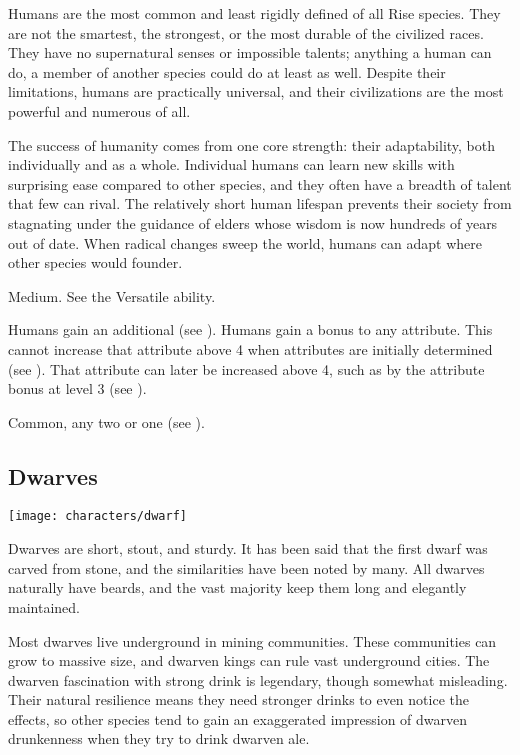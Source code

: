         Humans are the most common and least rigidly defined of all Rise species.
        They are not the smartest, the strongest, or the most durable of the civilized races.
        They have no supernatural senses or impossible talents; anything a human can do, a member of another species could do at least as well.
        Despite their limitations, humans are practically universal, and their civilizations are the most powerful and numerous of all.

        The success of humanity comes from one core strength: their adaptability, both individually and as a whole.
        Individual humans can learn new skills with surprising ease compared to other species, and they often have a breadth of talent that few can rival.
        The relatively short human lifespan prevents their society from stagnating under the guidance of elders whose wisdom is now hundreds of years out of date.
        When radical changes sweep the world, humans can adapt where other species would founder.

         Medium.
         See the Versatile ability.
        \begin{raggeditemize}
             Humans gain an additional  (see ).
             Humans gain a  bonus to any attribute.
                This cannot increase that attribute above 4 when attributes are initially determined (see ).
                That attribute can later be increased above 4, such as by the attribute bonus at level 3 (see ).
        \end{raggeditemize}
         Common, any two  or one  (see ).

    \subsection{Dwarves}
        \texttt{[image: characters/dwarf]}

        Dwarves are short, stout, and sturdy.
        It has been said that the first dwarf was carved from stone, and the similarities have been noted by many.
        All dwarves naturally have beards, and the vast majority keep them long and elegantly maintained.

        Most dwarves live underground in mining communities.
        These communities can grow to massive size, and dwarven kings can rule vast underground cities.
        The dwarven fascination with strong drink is legendary, though somewhat misleading.
        Their natural resilience means they need stronger drinks to even notice the effects, so other species tend to gain an exaggerated impression of dwarven drunkenness when they try to drink dwarven ale.

